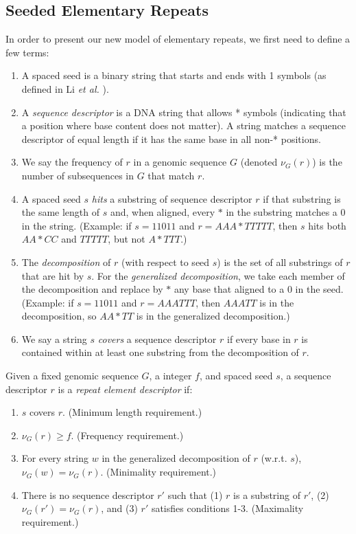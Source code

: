 \documentclass{bmcart}
\begin{document}
\subsection*{Seeded Elementary Repeats}
In order to present our new model of elementary repeats, we first need
to define a few terms:
\begin{enumerate}
  \item A spaced seed is a binary string that starts and ends with 1
    symbols (as defined in Li {\it et al.} \cite{Li:2004wl}).
  \item A {\it sequence descriptor} is a DNA string that allows *
    symbols (indicating that a position where base content does not
    matter).  A string matches a sequence descriptor of equal length if
    it has the same base in all non-* positions.
  \item We say the frequency of $r$ in a genomic sequence $G$ (denoted
    $\nu_G(r)$) is the number of subsequences in $G$ that match $r$.
  \item A spaced seed $s$ {\it hits} a substring of sequence
    descriptor $r$ if that substring is the same length of $s$ and,
    when aligned, every $*$ in the substring matches a 0 in the
    string.  (Example: if $s=11011$ and $r=AAA*TTTTT$, then $s$
    hits both $AA*CC$ and $TTTTT$, but not $A*TTT$.)
  \item The {\it decomposition} of $r$ (with respect to seed $s$) is
    the set of all substrings of $r$ that are hit by $s$.  For the
    {\it generalized decomposition}, we take each member of the
    decomposition and replace by $*$ any base that aligned to a 0 in
    the seed.  (Example: if $s=11011$ and $r=AAATTT$, then $AAATT$ is
    in the decomposition, so $AA*TT$ is in the generalized
    decomposition.)
  \item We say a string $s$ {\it covers} a sequence descriptor $r$ if
  every base in $r$ is contained within at least one substring from
  the decomposition of $r$.
\end{enumerate}


\begin{definition}
  \label{REDDef}
  Given a fixed genomic sequence $G$, a integer $f$, and spaced seed $s$, a sequence
  descriptor $r$ is a {\it repeat element descriptor} if:
  \begin{enumerate}
  \item $s$ covers $r$.  (Minimum length requirement.)
  \item $\nu_G(r) \geq f$.  (Frequency requirement.)
  \item For every string $w$ in the generalized decomposition of $r$
    (w.r.t. $s$), $\nu_G(w) = \nu_G(r)$.  (Minimality requirement.)
  \item There is no sequence descriptor $r'$ such that (1) $r$ is
    a substring of $r'$, (2) $\nu_G(r') = \nu_G(r)$, and (3) $r'$
    satisfies conditions 1-3.  (Maximality requirement.)
  \end{enumerate}
\end{definition}
\end{document}
